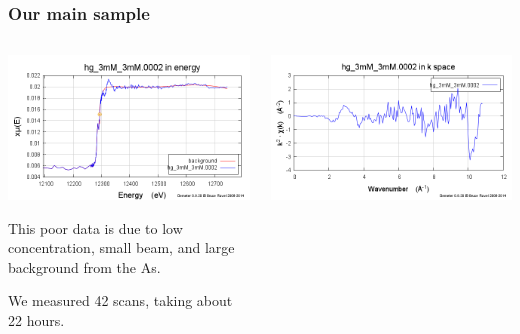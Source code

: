 \documentclass[10pt, xcolor=x11names, compress]{beamer}
\begin{document}
\begin{frame}
  \frametitle{Our main sample}
  \begin{columns}[T]
    \begin{column}{0.5\linewidth}
      \includegraphics[width=\linewidth]{images/firstscan_e.png}

      \bigskip

      This poor data is due to low concentration, small beam, and
      large background from the As.

      \bigskip

      We measured 42 scans, taking about 22 hours.
    \end{column}
    \begin{column}{0.5\linewidth}
      \includegraphics[width=\linewidth]{images/firstscan_k.png}


\end{column}
\end{columns}
\end{frame}
\end{document}

